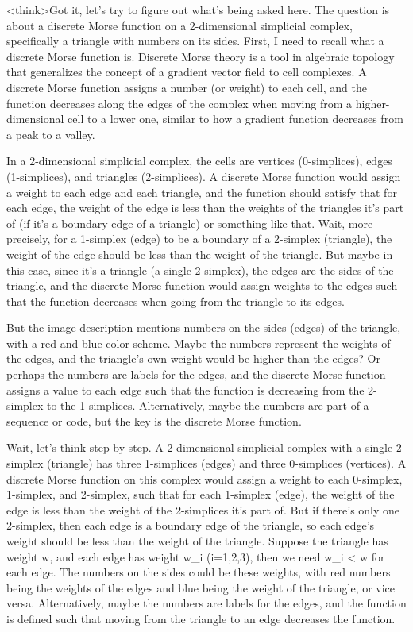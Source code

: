 <think>Got it, let's try to figure out what's being asked here. The question is about a discrete Morse function on a 2-dimensional simplicial complex, specifically a triangle with numbers on its sides. First, I need to recall what a discrete Morse function is. Discrete Morse theory is a tool in algebraic topology that generalizes the concept of a gradient vector field to cell complexes. A discrete Morse function assigns a number (or weight) to each cell, and the function decreases along the edges of the complex when moving from a higher-dimensional cell to a lower one, similar to how a gradient function decreases from a peak to a valley.

In a 2-dimensional simplicial complex, the cells are vertices (0-simplices), edges (1-simplices), and triangles (2-simplices). A discrete Morse function would assign a weight to each edge and each triangle, and the function should satisfy that for each edge, the weight of the edge is less than the weights of the triangles it's part of (if it's a boundary edge of a triangle) or something like that. Wait, more precisely, for a 1-simplex (edge) to be a boundary of a 2-simplex (triangle), the weight of the edge should be less than the weight of the triangle. But maybe in this case, since it's a triangle (a single 2-simplex), the edges are the sides of the triangle, and the discrete Morse function would assign weights to the edges such that the function decreases when going from the triangle to its edges.

But the image description mentions numbers on the sides (edges) of the triangle, with a red and blue color scheme. Maybe the numbers represent the weights of the edges, and the triangle's own weight would be higher than the edges? Or perhaps the numbers are labels for the edges, and the discrete Morse function assigns a value to each edge such that the function is decreasing from the 2-simplex to the 1-simplices. Alternatively, maybe the numbers are part of a sequence or code, but the key is the discrete Morse function.

Wait, let's think step by step. A 2-dimensional simplicial complex with a single 2-simplex (triangle) has three 1-simplices (edges) and three 0-simplices (vertices). A discrete Morse function on this complex would assign a weight to each 0-simplex, 1-simplex, and 2-simplex, such that for each 1-simplex (edge), the weight of the edge is less than the weight of the 2-simplices it's part of. But if there's only one 2-simplex, then each edge is a boundary edge of the triangle, so each edge's weight should be less than the weight of the triangle. Suppose the triangle has weight w, and each edge has weight w_i (i=1,2,3), then we need w_i < w for each edge. The numbers on the sides could be these weights, with red numbers being the weights of the edges and blue being the weight of the triangle, or vice versa. Alternatively, maybe the numbers are labels for the edges, and the function is defined such that moving from the triangle to an edge decreases the function.

